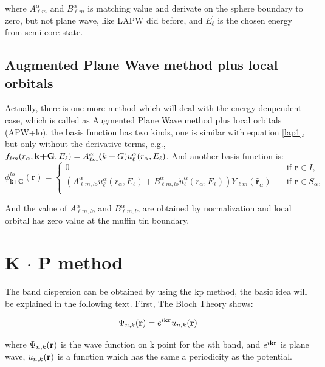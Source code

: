 \documentclass[a4paper, 12pt, titlepage,oneside,drop]{kthesis}
\begin{document}
\noindent where $A _{{\ell}m}^{\alpha}$ and $B _{{\ell}m}^{\alpha}$ is matching value and derivate on the sphere boundary to zero, but not plane wave, like LAPW did before, and $E^{\prime}_{\ell}$ is
the chosen energy from semi-core state.

\section{Augmented Plane Wave method plus local orbitals}
\noindent Actually, there is one more method which will deal with the energy-denpendent case, which is called as Augmented Plane Wave method plus local orbitals (APW+lo), the 
basis function has two kinds, one is similar with equation \ref{lap1}, but only without the derivative terms, e.g., $f_{{\ell}{m}} (r_{\alpha},\textbf{k+G} ,E_{\ell}) =  A _{{\ell}m}^{\alpha} \textbf(k+G) u_{{\ell}}^{\alpha}(r_{\alpha}, E_{\ell})$.
And another basis function is:
\begin{equation*}\label{lap3}
\phi^{lo}_\textbf{k+G} (\textbf{r})= 
\begin{cases} 0 & \quad \mbox{if $\textbf{r} \in I, $}
\\
(A _{{\ell}m,lo}^{\alpha}  u_{{\ell}}^{\alpha}(r_{\alpha}, E_{\ell}) + B _{{\ell}m,lo}^{\alpha}  \dot{u}_{{\ell}}^{\alpha}(r_{\alpha}, E_{\ell}) ){Y_{{\ell}m}(\hat{\textbf{r}}_{\alpha})} & \quad \mbox{if $\textbf{r} \in S_\alpha, $}\\ 
\end{cases}
\end{equation*}
 
\noindent And the value of $A _{{\ell}m,lo}^{\alpha}$ and $B _{{\ell}m,lo}^{\alpha}$ are obtained by normalization and local orbital has zero value at the muffin tin boundary.

\chapter{K $\cdot$ P method}



The band dispersion can be obtained by using the kp method, the basic idea will be explained in the following text.
First, The Bloch Theory shows:

\begin{equation}\label{1}
 \wfbloch<n><k> = \expg<k> \ubloch<n><k>
\end{equation}

where $\wfbloch<n><k>$ is the wave function on k point for the {\textit n}th band, and $\expg<k>$ is plane wave, $\ubloch<n><k>$ is a function which has the same a periodicity as the potential.
\end{document}
